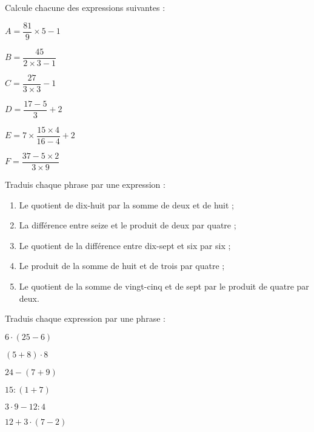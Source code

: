 \begin{exercice}
Calcule chacune des expressions suivantes :

$A = \dfrac{81}{9} \times 5 - 1$ \dotfill

\dotfill

$B = \dfrac{45}{2 \times 3 - 1}$ \dotfill

\dotfill

$C = \dfrac{27}{3 \times 3} - 1$ \dotfill

\dotfill

$D = \dfrac{17 - 5}{3} + 2$ \dotfill 

\dotfill

$E = 7 \times \dfrac{15 \times 4}{16 - 4} + 2$ \dotfill 

\dotfill

$F = \dfrac{37 - 5 \times 2}{3 \times 9}$ \dotfill

\dotfill
\end{exercice}




\begin{exercice}
Traduis chaque phrase par une expression :
\begin{enumerate}
 \item Le quotient de dix-huit par la somme de deux et de huit ;
 \item La différence entre seize et le produit de deux par quatre ;
 \item Le quotient de la différence entre dix-sept et six par six ;
 \item Le produit de la somme de huit et de trois par quatre ;
 \item Le quotient de la somme de vingt-cinq et de sept par le produit de quatre par deux.
 \end{enumerate}
\end{exercice}


\begin{exercice}
Traduis chaque expression par une phrase :
\begin{colenumerate}{2}
 \item $6 \cdot (25 - 6)$
 \item $(5 + 8) \cdot 8$
 \item $24 - (7 + 9)$
 \item $15 : (1 + 7)$
 \item $3 \cdot 9 - 12 : 4$
 \item $12 + 3 \cdot (7 - 2)$
 \end{colenumerate}
\end{exercice} 


